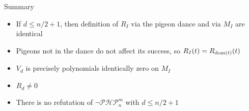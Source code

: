 \documentclass[xcolor={dvipsnames}, aspectratio=169, handout]{beamer}
\newcommand{\PHP}{\ensuremath{\neg \mathcal{PHP}^m_n}\xspace}
\begin{document}
\begin{frame}{Summary}
    \begin{itemize}[<+->]
        \item If $d \leq n/2 + 1$, then definition of $R_I$ via the pigeon dance and via $M_I$ are identical
        \item Pigeons not in the dance do not affect its success, so $R_I(t) = R_{\operatorname{dom}(t)}(t)$
        \item $V_d$ is precisely polynomials identically zero on $M_I$
        \item $R_d \neq 0$
        \item There is no refutation of \PHP with $d \leq n/2 +1$
    \end{itemize}
\end{frame}
\end{document}
